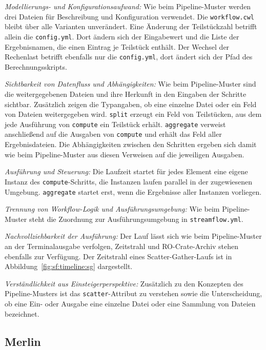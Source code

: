\begin{sloppypar}
\emph{Modellierungs- und Konfigurationsaufwand:} Wie beim
Pipeline-Muster werden drei Dateien für Beschreibung und
Konfiguration verwendet. Die \texttt{workflow.cwl} bleibt über alle
Varianten unverändert. Eine Änderung der Teilstückzahl betrifft allein
die \texttt{config.yml}. Dort ändern sich der Eingabewert und die
Liste der Ergebnisnamen, die einen Eintrag je Teilstück enthält. Der
Wechsel der Rechenlast betrifft ebenfalls nur die
\texttt{config.yml}, dort ändert sich der Pfad des
Berechnungsskripts.
\end{sloppypar}

\emph{Sichtbarkeit von Datenfluss und Abhängigkeiten:} Wie beim
Pipeline-Muster sind die weitergegebenen Dateien und ihre Herkunft
in den Eingaben der Schritte sichtbar. Zusätzlich zeigen die
Typangaben, ob eine einzelne Datei oder ein Feld von Dateien
weitergegeben wird. \texttt{split} erzeugt ein Feld von Teilstücken,
aus dem jede Ausführung von \texttt{compute} ein Teilstück erhält.
\texttt{aggregate} verweist anschließend auf die Ausgaben von
\texttt{compute} und erhält das Feld aller Ergebnisdateien. Die
Abhängigkeiten zwischen den Schritten ergeben sich damit wie beim
Pipeline-Muster aus diesen Verweisen auf die jeweiligen Ausgaben.

\emph{Ausführung und Steuerung:} Die Laufzeit startet für jedes
Element eine eigene Instanz des \texttt{compute}-Schritts, die
Instanzen laufen parallel in der zugewiesenen Umgebung.
\texttt{aggregate} startet erst, wenn die Ergebnisse aller Instanzen
vorliegen.


\emph{Trennung von Workflow-Logik und Ausführungsumgebung:} Wie beim
Pipeline-Muster steht die Zuordnung zur Ausführungsumgebung in
\texttt{streamflow.yml}.



\emph{Nachvollziehbarkeit der Ausführung:} Der Lauf lässt sich wie
beim Pipeline-Muster an der Terminalausgabe verfolgen, Zeitstrahl
und RO-Crate-Archiv stehen ebenfalls zur Verfügung. Der Zeitstrahl
eines Scatter-Gather-Laufs ist in
Abbildung~\ref{fig:sf:timeline:sg} dargestellt.

\emph{Verständlichkeit aus Einsteigerperspektive:} Zusätzlich zu den
Konzepten des Pipeline-Musters ist das \texttt{scatter}-Attribut zu
verstehen sowie die Unterscheidung, ob eine Ein- oder Ausgabe eine
einzelne Datei oder eine Sammlung von Dateien bezeichnet.

\subsection{Merlin}
\label{sec:lokal:sg:merlin}

